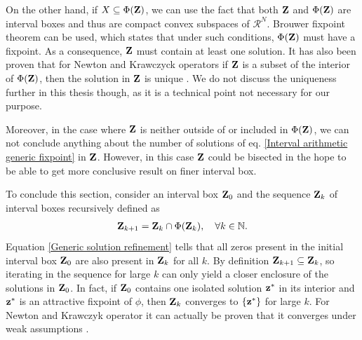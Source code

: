 \documentclass[
11pt, %
english, %
singlespacing, %
nolistspacing, %
liststotoc, %
headsepline, %
]{MastersDoctoralThesis} %
\begin{document}
On the other hand, if $X \subseteq \Phi(\boldsymbol{\mathrm{Z}})$, we can use the fact that both $\boldsymbol{\mathrm{Z}}$ and $\Phi(\boldsymbol{\mathrm{Z}})$ are interval boxes and thus are compact convex subspaces of $\mathcal{R}^N$. Brouwer fixpoint theorem can be used, which states that under such conditions, $\Phi(\boldsymbol{\mathrm{Z}})$ must have a fixpoint. As a consequence, $\boldsymbol{\mathrm{Z}}$ must contain at least one solution. It has also been proven that for Newton and Krawczyck operators if $\boldsymbol{\mathrm{Z}}$ is a subset of the interior of $\Phi(\boldsymbol{\mathrm{Z}})$, then the solution in $\boldsymbol{\mathrm{Z}}$ is unique \cite{moore2009introduction, tucker2011validated}. We do not discuss the uniqueness further in this thesis though, as it is a technical point not necessary for our purpose.

Moreover, in the case where $\boldsymbol{\mathrm{Z}}$ is neither outside of or included in $\Phi(\boldsymbol{\mathrm{Z}})$, we can not conclude anything about the number of solutions of eq. \eqref{Interval arithmetic generic fixpoint} in $\boldsymbol{\mathrm{Z}}$. However, in this case $\boldsymbol{\mathrm{Z}}$ could be bisected in the hope to be able to get more conclusive result on finer interval box.

To conclude this section, consider an interval box $\boldsymbol{\mathrm{Z}}_0$ and the sequence $\boldsymbol{\mathrm{Z}}_k$ of interval boxes recursively defined as
\begin{align}
	\boldsymbol{\mathrm{Z}}_{k+1} = \boldsymbol{\mathrm{Z}}_k \cap \Phi(\boldsymbol{\mathrm{Z}}_k), \quad \forall k \in \mathbb{N}. \label{Generic refinement iteration}
\end{align}
Equation \eqref{Generic solution refinement} tells that all zeros present in the initial interval box $\boldsymbol{\mathrm{Z}}_0$ are also present in $\boldsymbol{\mathrm{Z}}_k$ for all $k$. By definition $\boldsymbol{\mathrm{Z}}_{k+1} \subseteq \boldsymbol{\mathrm{Z}}_k$, so iterating in the sequence for large $k$ can only yield a closer enclosure of the solutions in $\boldsymbol{\mathrm{Z}}_0$. In fact, if $\boldsymbol{\mathrm{Z}}_0$ contains one isolated solution $\boldsymbol{\mathrm{z}}^*$ in its interior and $\boldsymbol{\mathrm{z}}^*$ is an attractive fixpoint of $\phi$, then $\boldsymbol{\mathrm{Z}}_k$ converges to $\{\boldsymbol{\mathrm{z}}^*\}$ for large $k$. For Newton and Krawczyk operator it can actually be proven that it converges under weak assumptions \cite{moore2009introduction, tucker2011validated}.
\end{document}

